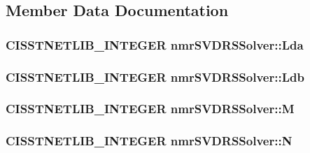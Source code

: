 \subsection{Member Data Documentation}
\hypertarget{classnmr_s_v_d_r_s_solver_aa80a92f8293e49713e6d8f750ba7b774}{
\subsubsection[{Lda}]{\setlength{\rightskip}{0pt plus 5cm}C\-I\-S\-S\-T\-N\-E\-T\-L\-I\-B\-\_\-\-I\-N\-T\-E\-G\-E\-R nmr\-S\-V\-D\-R\-S\-Solver\-::\-Lda\hspace{0.3cm}{\ttfamily [protected]}}}\label{classnmr_s_v_d_r_s_solver_aa80a92f8293e49713e6d8f750ba7b774}
\hypertarget{classnmr_s_v_d_r_s_solver_a4447d227e273f88a53834901df316b95}{
\subsubsection[{Ldb}]{\setlength{\rightskip}{0pt plus 5cm}C\-I\-S\-S\-T\-N\-E\-T\-L\-I\-B\-\_\-\-I\-N\-T\-E\-G\-E\-R nmr\-S\-V\-D\-R\-S\-Solver\-::\-Ldb\hspace{0.3cm}{\ttfamily [protected]}}}\label{classnmr_s_v_d_r_s_solver_a4447d227e273f88a53834901df316b95}
\hypertarget{classnmr_s_v_d_r_s_solver_ac96d6c9453bc57e859533512ab2022a3}{
\subsubsection[{M}]{\setlength{\rightskip}{0pt plus 5cm}C\-I\-S\-S\-T\-N\-E\-T\-L\-I\-B\-\_\-\-I\-N\-T\-E\-G\-E\-R nmr\-S\-V\-D\-R\-S\-Solver\-::\-M\hspace{0.3cm}{\ttfamily [protected]}}}\label{classnmr_s_v_d_r_s_solver_ac96d6c9453bc57e859533512ab2022a3}
\hypertarget{classnmr_s_v_d_r_s_solver_acf36506705c504c2d35e3c831dfe4871}{
\subsubsection[{N}]{\setlength{\rightskip}{0pt plus 5cm}C\-I\-S\-S\-T\-N\-E\-T\-L\-I\-B\-\_\-\-I\-N\-T\-E\-G\-E\-R nmr\-S\-V\-D\-R\-S\-Solver\-::\-N\hspace{0.3cm}{\ttfamily [protected]}}}\label{classnmr_s_v_d_r_s_solver_acf36506705c504c2d35e3c831dfe4871}
